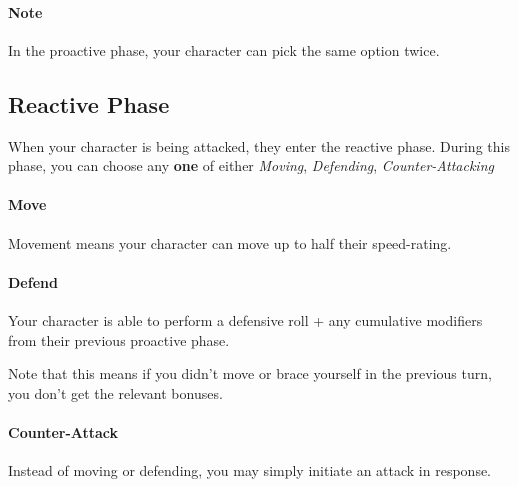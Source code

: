 \paragraph{Note} In the proactive phase, your character can pick the same option twice.

\subsection{Reactive Phase}
When your character is being attacked, they enter the reactive phase.
During this phase, you can choose any \textbf{one} of either \textit{Moving}, \textit{Defending}, \textit{Counter-Attacking}

\paragraph{Move}
Movement means your character can move up to half their speed-rating.

\paragraph{Defend}
Your character is able to perform a defensive roll + any cumulative modifiers from their previous proactive phase.

Note that this means if you didn't move or brace yourself in the previous turn, you don't get the relevant bonuses.

\paragraph{Counter-Attack}
Instead of moving or defending, you may simply initiate an attack in response.